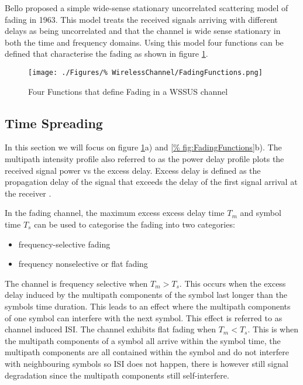 Bello \cite{Bello63} proposed a simple wide-sense %
stationary uncorrelated scattering model of fading in %
1963. This model treats the received signals arriving %
with different delays as being uncorrelated and that %
the channel is wide sense stationary in both the time %
and frequency domains. Using this model four functions %
can be defined that characterise the fading as shown in %
figure \ref{fig:FadingFunctions}.
\begin{figure}[ht]
	\centering
	\texttt{[image: ./Figures/\%
		WirelessChannel/FadingFunctions.png]}
	\caption{Four Functions that define Fading in %
			a WSSUS channel \cite{Sklar01}}
	\label{fig:FadingFunctions}
\end{figure}

\FloatBarrier
\subsection{Time Spreading}
In this section we will focus on figure %
\ref{fig:FadingFunctions}a) and \ref{%
fig:FadingFunctions}b). The multipath %
intensity profile also referred to as the %
power delay profile plots the received %
signal power vs the excess delay. %
Excess delay is defined as the propagation %
delay of the signal that exceeds the delay %
of the first signal arrival at the receiver %
\cite{Sklar01}.

In the fading channel, the maximum excess %
excess delay time $T_{m}$ and symbol time %
$T_{s}$ can be used to categorise the %
fading into two categories:
\begin{itemize}
	\item{frequency-selective fading}
	\item{frequency nonselective or flat fading}
\end{itemize}
The channel is frequency selective when %
$T_{m} > T_{s}$. This occurs when the %
excess delay induced by the multipath %
components of the symbol last longer %
than the symbols time duration. This leads %
to an effect where the multipath components %
of one symbol can interfere with the next symbol. %
This effect is referred to as channel induced ISI. The %
channel exhibits flat fading when %
$T_{m} < T_{s}$. This is when %
the multipath components of a symbol %
all arrive within the symbol time, the multipath %
components are all contained within the symbol and %
do not interfere with neighbouring symbols so ISI %
does not happen, there is however still signal %
degradation since the multipath components still %
self-interfere.

